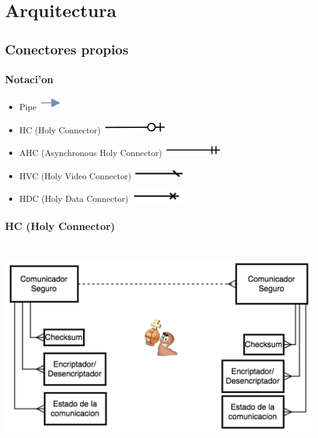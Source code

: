 
\section{Arquitectura}
\subsection{Conectores propios}
\subsubsection{Notaci'on}

\begin{itemize}
\item Pipe \includegraphics[height=0.6cm]{diagramas/NPIPE} 
\item HC (Holy Connector) \includegraphics[height=0.5cm]{diagramas/NHC} 
\item AHC (Asynchronous Holy Connector) \includegraphics[height=0.5cm]{diagramas/NHCCA}
\item HVC (Holy Video Connector) \includegraphics[height=0.5cm]{diagramas/NHVC} 
\item HDC (Holy Data Connector) \includegraphics[height=0.5cm]{diagramas/NHDC} 

\end{itemize}

\subsubsection{HC (Holy Connector)}

\includegraphics[height=9cm]{diagramas/HC} 


